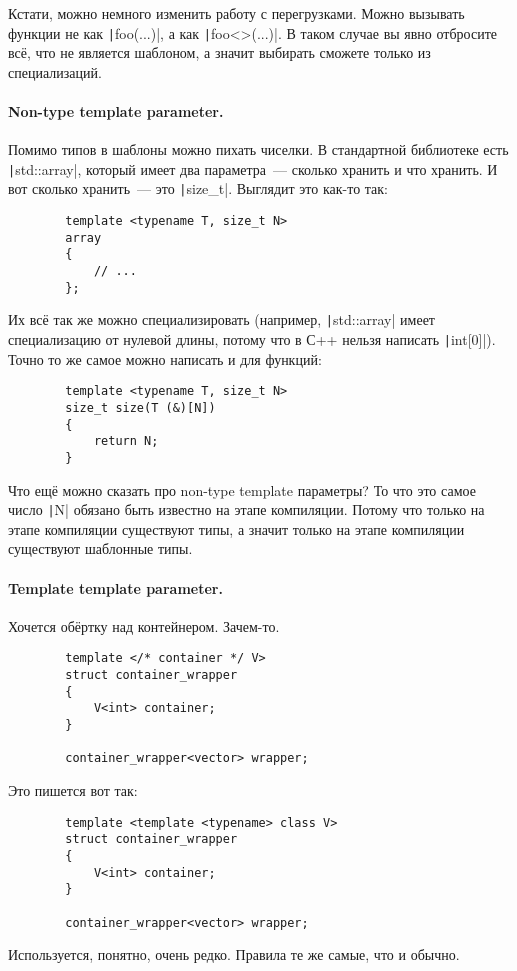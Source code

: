 \documentclass{article}
\begin{document}
    Кстати, можно немного изменить работу с перегрузками. Можно вызывать функции не как \texttt|foo(...)|, а как \texttt|foo<>(...)|. В таком случае вы явно отбросите всё, что не является шаблоном, а значит выбирать сможете только из специализаций.
    \paragraph{Non-type template parameter.}
    Помимо типов в шаблоны можно пихать чиселки. В стандартной библиотеке есть \texttt|std::array|, который имеет два параметра~--- сколько хранить и что хранить. И вот сколько хранить~--- это \texttt|size_t|. Выглядит это как-то так:
    \begin{verbatim}
        template <typename T, size_t N>
        array
        {
            // ...
        };
    \end{verbatim}
    Их всё так же можно специализировать (например, \texttt|std::array| имеет специализацию от нулевой длины, потому что в С++ нельзя написать \texttt|int[0]|). Точно то же самое можно написать и для функций:
    \begin{verbatim}
        template <typename T, size_t N>
        size_t size(T (&)[N])
        {
            return N;
        }
    \end{verbatim}
    Что ещё можно сказать про non-type template параметры? То что это самое число \texttt|N| обязано быть известно на этапе компиляции. Потому что только на этапе компиляции существуют типы, а значит только на этапе компиляции существуют шаблонные типы.
    \paragraph{Template template parameter.}
    Хочется обёртку над контейнером. Зачем-то.
    \begin{verbatim}
        template </* container */ V>
        struct container_wrapper
        {
            V<int> container;
        }

        container_wrapper<vector> wrapper;
    \end{verbatim}
    Это пишется вот так:
    \begin{verbatim}
        template <template <typename> class V>
        struct container_wrapper
        {
            V<int> container;
        }
        
        container_wrapper<vector> wrapper;
    \end{verbatim}
    Используется, понятно, очень редко. Правила те же самые, что и обычно.
\end{document}
